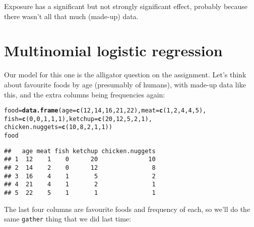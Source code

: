 \documentclass{article}\usepackage[]{graphicx}\usepackage[]{color}
\makeatletter
\newcommand{\hlnum}[1]{\textcolor[rgb]{0.686,0.059,0.569}{#1}}%
\newcommand{\hlstd}[1]{\textcolor[rgb]{0.345,0.345,0.345}{#1}}%
\newcommand{\hlkwb}[1]{\textcolor[rgb]{0.69,0.353,0.396}{#1}}%
\newcommand{\hlkwc}[1]{\textcolor[rgb]{0.333,0.667,0.333}{#1}}%
\newcommand{\hlkwd}[1]{\textcolor[rgb]{0.737,0.353,0.396}{\textbf{#1}}}%
\newenvironment{kframe}{%
 \def\at@end@of@kframe{}%
 \ifinner\ifhmode%
  \def\at@end@of@kframe{\end{minipage}}%
  \begin{minipage}{\columnwidth}%
 \fi\fi%
 \def\FrameCommand##1{\hskip\@totalleftmargin \hskip-\fboxsep
 \colorbox{shadecolor}{##1}\hskip-\fboxsep
     \hskip-\linewidth \hskip-\@totalleftmargin \hskip\columnwidth}%
 \MakeFramed {\advance\hsize-\width
   \@totalleftmargin\z@ \linewidth\hsize
   \@setminipage}}%
 {\par\unskip\endMakeFramed%
 \at@end@of@kframe}
\newenvironment{knitrout}{}{} %
\makeatother
\begin{document}
Exposure has a significant but not strongly significant  effect,
probably because there wasn't all that much (made-up) data.

\section{Multinomial logistic regression}

Our model for this one is the alligator question on the
assignment. Let's think about favourite foods by age (presumably of
humans), with made-up data like this, and the extra columns being
frequencies again:

\begin{knitrout}
\color{fgcolor}\begin{kframe}
\begin{alltt}
\hlstd{food}\hlkwb{=}\hlkwd{data.frame}\hlstd{(}\hlkwc{age}\hlstd{=}\hlkwd{c}\hlstd{(}\hlnum{12}\hlstd{,}\hlnum{14}\hlstd{,}\hlnum{16}\hlstd{,}\hlnum{21}\hlstd{,}\hlnum{22}\hlstd{),}\hlkwc{meat}\hlstd{=}\hlkwd{c}\hlstd{(}\hlnum{1}\hlstd{,}\hlnum{2}\hlstd{,}\hlnum{4}\hlstd{,}\hlnum{4}\hlstd{,}\hlnum{5}\hlstd{),}
  \hlkwc{fish}\hlstd{=}\hlkwd{c}\hlstd{(}\hlnum{0}\hlstd{,}\hlnum{0}\hlstd{,}\hlnum{1}\hlstd{,}\hlnum{1}\hlstd{,}\hlnum{1}\hlstd{),}\hlkwc{ketchup}\hlstd{=}\hlkwd{c}\hlstd{(}\hlnum{20}\hlstd{,}\hlnum{12}\hlstd{,}\hlnum{5}\hlstd{,}\hlnum{2}\hlstd{,}\hlnum{1}\hlstd{),}
  \hlkwc{chicken.nuggets}\hlstd{=}\hlkwd{c}\hlstd{(}\hlnum{10}\hlstd{,}\hlnum{8}\hlstd{,}\hlnum{2}\hlstd{,}\hlnum{1}\hlstd{,}\hlnum{1}\hlstd{))}
\hlstd{food}
\end{alltt}
\begin{verbatim}
##   age meat fish ketchup chicken.nuggets
## 1  12    1    0      20              10
## 2  14    2    0      12               8
## 3  16    4    1       5               2
## 4  21    4    1       2               1
## 5  22    5    1       1               1
\end{verbatim}
\end{kframe}
\end{knitrout}

The last four columns are favourite foods and frequency of each, so
we'll do the same \texttt{gather} thing that we did last time:
\end{document}
